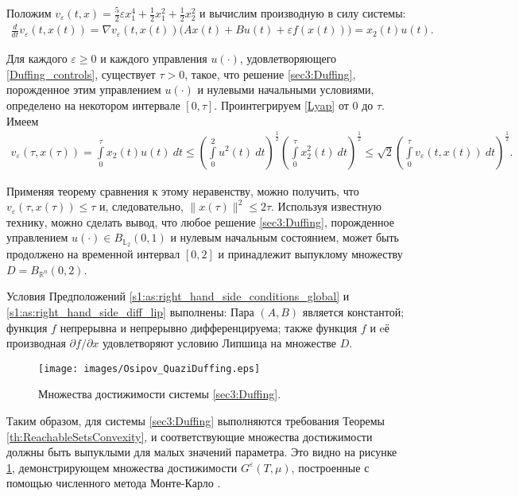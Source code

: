\documentclass[../main.tex]{subfiles}
\begin{document}
 Положим $v_{\varepsilon}(t,x) = \frac{5}{2}\varepsilon x_1^4 + \frac{1}{2}x_1^2 + \frac{1}{2}x_2^2$ и вычислим производную в силу системы:
 \begin{gather}\label{Lyap}
 \frac{d}{dt} v_{\varepsilon}(t,x(t)) = \nabla v_{\varepsilon}(t,x(t)) \big(A x(t) + B u(t) + \varepsilon f(x(t))\big) = x_2(t) u(t). 
 \end{gather} 
 
 Для каждого $\varepsilon \geqslant 0$ и каждого управления $u(\cdot)$, удовлетворяющего \eqref{Duffing_controls}, существует \mbox{$\tau>0$}, такое, что решение \eqref{sec3:Duffing}, порожденное этим управлением $u(\cdot)$ и нулевыми начальными условиями, определено на некотором интервале $[0, \tau]$. 
 Проинтегрируем \eqref{Lyap} от $0$ до $\tau$. 
 Имеем 
 \begin{gather*}
 v_{\varepsilon}(\tau,x(\tau)) =
 \int\limits_0^{\tau} x_2(t) u(t) \ dt 
 \leqslant 
 \left(\int\limits_0^2 u^2(t) \ dt \right)^{\frac{1}{2}} \left(\int\limits_0^{\tau} x_2^2(t) \ dt \right)^{\frac{1}{2}} \leqslant \sqrt{2} \left(\int\limits_0^{\tau} v_{\varepsilon}(t,x(t)) \ dt \right)^{\frac{1}{2}}.
 \end{gather*}
 
 Применяя теорему сравнения к этому неравенству, можно получить, что $v_{\varepsilon}(\tau,x(\tau)) \leqslant \tau$ и, следовательно, $\|x(\tau)\|^2 \leqslant 2 \tau$. 
 Используя известную технику, можно сделать вывод, что любое решение \eqref{sec3:Duffing}, порожденное управлением $u(\cdot) \in B_{\mathbb{L}_2}(0,1)$ и нулевым начальным состоянием, может быть продолжено на временной интервал $[0,2]$ и принадлежит выпуклому множеству $D = B_{\mathbb{R}^n}(0,2)$.
 
 Условия Предположений \ref{s1:as:right_hand_side_conditions_global} и \ref{s1:as:right_hand_side_diff_lip} выполнены: Пара $(A,B)$ является константой; функция $f$ непрерывна и непрерывно дифференцируема; также функция $f$ и eё производная $\partial f/\partial x$ удовлетворяют условию Липшица на множестве $D$.
 
 \begin{figure}[t]
 \centerline{
 \texttt{[image: images/Osipov\_QuaziDuffing.eps]}}
 \caption{Множества достижимости системы \eqref{sec3:Duffing}.}
 \label{fig:Duffing}
 \end{figure}
 
 Таким образом, для системы \eqref{sec3:Duffing} выполняются требования Теоремы \ref{th:ReachableSetsConvexity}, и соответствующие множества достижимости должны быть выпуклыми для малых значений параметра. 
 Это видно на рисунке \ref{fig:Duffing}, демонстрирующем множества достижимости $G^{\varepsilon}(T,\mu)$, построенные с помощью численного метода Монте-Карло \cite{Patent,Zykov}.
 
\end{document}
